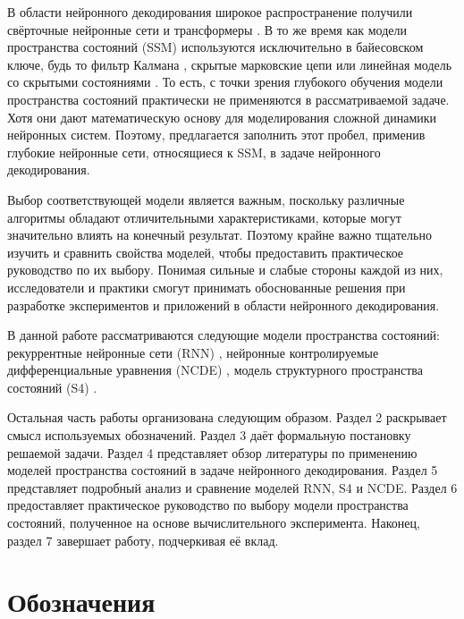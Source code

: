 \documentclass[a4paper, 12pt]{article}
\begin{document}
	В области нейронного декодирования широкое распространение получили свёрточные нейронные сети \citep{eegnet, htnet} и трансформеры \citep{defossez2022decoding, tang2023semantic}.
	В то же время как модели пространства состояний (SSM) используются исключительно в байесовском ключе, будь то фильтр Калмана \citep{kalman1961}, скрытые марковские цепи \citep{paninski2010new} или линейная модель со скрытыми состояниями \citep{wu2009neural}.
	То есть, с точки зрения глубокого обучения модели пространства состояний практически не применяются в рассматриваемой задаче.
	Хотя они дают математическую основу для моделирования сложной динамики нейронных систем.
	Поэтому, предлагается заполнить этот пробел, применив глубокие нейронные сети, относящиеся к SSM, в задаче нейронного декодирования.
	
	Выбор соответствующей модели является важным, поскольку различные алгоритмы обладают отличительными характеристиками, которые могут значительно влиять на конечный результат.
	Поэтому крайне важно тщательно изучить и сравнить свойства моделей, чтобы предоставить практическое руководство по их выбору. 
	Понимая сильные и слабые стороны каждой из них, исследователи и практики смогут принимать обоснованные решения при разработке экспериментов и приложений в области нейронного декодирования.
	
	В данной работе рассматриваются следующие модели пространства состояний: рекуррентные нейронные сети (RNN) \citep{rnn}, нейронные контролируемые дифференциальные уравнения (NCDE) \citep{ncde}, модель структурного пространства состояний (S4) \citep{s4}.
	
	Остальная часть работы организована следующим образом. Раздел 2 раскрывает смысл используемых обозначений. Раздел 3 даёт формальную постановку решаемой задачи. Раздел 4 представляет обзор литературы по применению моделей пространства состояний в задаче нейронного декодирования. Раздел 5 представляет подробный анализ и сравнение моделей RNN, S4 и NCDE. Раздел 6 предоставляет практическое руководство по выбору модели пространства состояний, полученное на основе вычислительного эксперимента. Наконец, раздел 7 завершает работу, подчеркивая её вклад.
	
	\section{Обозначения}
	
\end{document}

